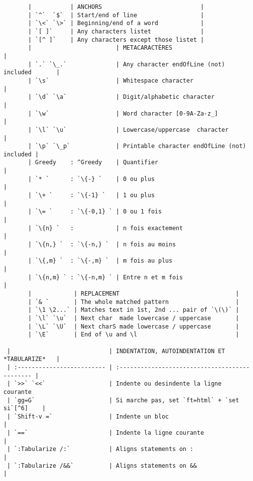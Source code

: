 \documentclass[10pt,landscape]{article}
\begin{document}
\begin{multicols}{2}
\begin{verbatim}
       |           | ANCHORS                            |
       | `^`  `$`  | Start/end of line                  |
       | `\<` `\>` | Beginning/end of a word            |
       | `[ ]`     | Any characters listet              |
       | `[^ ]`    | Any characters except those listet |
       |                        | METACARACTÈRES                               |
       | `.` `\_.`              | Any character endOfLine (not) included       |
       | `\s`                   | Whitespace character                         |
       | `\d` `\a`              | Digit/alphabetic character                   |
       | `\w`                   | Word character [0-9A-Za-z_]                  |
       | `\l` `\u`              | Lowercase/uppercase  character               |
       | `\p` `\_p`             | Printable character endOfLine (not) included |
       | Greedy    : ^Greedy    | Quantifier                                   |
       | `* `      : `\{-} `    | 0 ou plus                                    |
       | `\+ `     : `\{-1} `   | 1 ou plus                                    |
       | `\= `     : `\{-0,1} ` | 0 ou 1 fois                                  |
       | `\{n} `   :            | n fois exactement                            |
       | `\{n,} `  : `\{-n,} `  | n fois au moins                              |
       | `\{,m} `  : `\{-,m} `  | m fois au plus                               |
       | `\{n,m} ` : `\{-n,m} ` | Entre n et m fois                            |
       |            | REPLACEMENT                                 |
       | `& `       | The whole matched pattern                   |
       | `\1 \2...` | Matches text in 1st, 2nd ... pair of `\(\)` |
       | `\l` `\u`  | Next char  made lowercase / uppercase       |
       | `\L` `\U`  | Next charS made lowercase / uppercase       | 
       | `\E`       | End of \u and \l                            |

 |                            | INDENTATION, AUTOINDENTATION ET *TABULARIZE*   |
 | :------------------------- | :--------------------------------------------- |
 | `>>` `<<`                  | Indente ou desindente la ligne courante
 | `gg=G`                     | Si marche pas, set `ft=html` + `set si`[^6]    |
 | `Shift-v =`                | Indente un bloc                                |
 | `==`                       | Indente la ligne courante                      |
 | `:Tabularize /:`           | Aligns statements on :                         |
 | `:Tabularize /&&`          | Aligns statements on &&                        |


\end{verbatim}
\end{multicols}
\end{document}
